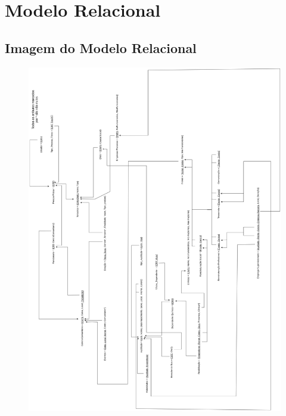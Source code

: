 \section{Modelo Relacional}
\subsection{Imagem do Modelo Relacional}

\begin{figure}[H]
    \centering
    \includegraphics[scale=0.13]{images/Modelo_Relacional_VF.png}
    \label{fig:Relacional}
\end{figure}

